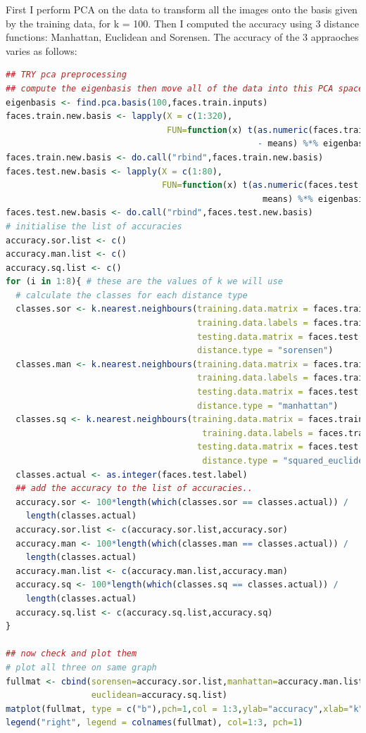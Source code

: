 \documentclass[11pt]{article}
\begin{document}
First I perform PCA on the data to transform all the images onto the basis given by the training data, for k = 100. Then I computed the accuracy using 3 distance functions: Manhattan, Euclidean and Sorensen. The accuracy of the 3 appraoches varies as follows:
\begin{lstlisting}[linewidth=18.4cm,language=R]
## TRY pca preprocessing
## compute the eigenbasis then move all of the data into this PCA space
eigenbasis <- find.pca.basis(100,faces.train.inputs)
faces.train.new.basis <- lapply(X = c(1:320),
                                FUN=function(x) t(as.numeric(faces.train.inputs[x,]) 
                                                  - means) %*% eigenbasis)
faces.train.new.basis <- do.call("rbind",faces.train.new.basis)
faces.test.new.basis <- lapply(X = c(1:80),
                               FUN=function(x) t(as.numeric(faces.test.inputs[x,]) -
                                                   means) %*% eigenbasis)
faces.test.new.basis <- do.call("rbind",faces.test.new.basis)
# initialise the list of accuracies
accuracy.sor.list <- c()
accuracy.man.list <- c()
accuracy.sq.list <- c()
for (i in 1:8){ # these are the values of k we will use
  # calculate the classes for each distance type
  classes.sor <- k.nearest.neighbours(training.data.matrix = faces.train.new.basis , 
                                      training.data.labels = faces.train.label, 
                                      testing.data.matrix = faces.test.new.basis,K=i, 
                                      distance.type = "sorensen")
  classes.man <- k.nearest.neighbours(training.data.matrix = faces.train.new.basis, 
                                      training.data.labels = faces.train.label, 
                                      testing.data.matrix = faces.test.new.basis,K=i,
                                      distance.type = "manhattan")
  classes.sq <- k.nearest.neighbours(training.data.matrix = faces.train.new.basis, 
                                       training.data.labels = faces.train.label, 
                                      testing.data.matrix = faces.test.new.basis,K=i, 
                                       distance.type = "squared_euclidean")
  classes.actual <- as.integer(faces.test.label)
  ## add the accuracy to the list of accuracies..
  accuracy.sor <- 100*length(which(classes.sor == classes.actual)) / 
    length(classes.actual)
  accuracy.sor.list <- c(accuracy.sor.list,accuracy.sor)
  accuracy.man <- 100*length(which(classes.man == classes.actual)) / 
    length(classes.actual)
  accuracy.man.list <- c(accuracy.man.list,accuracy.man)
  accuracy.sq <- 100*length(which(classes.sq == classes.actual)) / 
    length(classes.actual)
  accuracy.sq.list <- c(accuracy.sq.list,accuracy.sq)
}

## now check and plot them
# plot all three on same graph
fullmat <- cbind(sorensen=accuracy.sor.list,manhattan=accuracy.man.list,
                 euclidean=accuracy.sq.list)
matplot(fullmat, type = c("b"),pch=1,col = 1:3,ylab="accuracy",xlab="k") #plot
legend("right", legend = colnames(fullmat), col=1:3, pch=1) 
\end{lstlisting}
\end{document}
